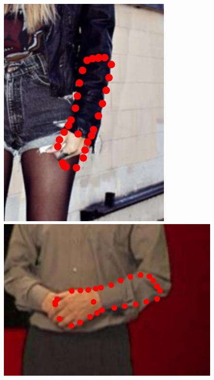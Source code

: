 \begin{figure}
    \includegraphics[height=\ofh]{resources/Annotation_Correction/Suplementory_Meterial/ExFit/0007}
    \hfill
    \includegraphics[height=\ofh]{resources/Annotation_Correction/Suplementory_Meterial/ExFit/0008}
    \hfill

\end{figure}
